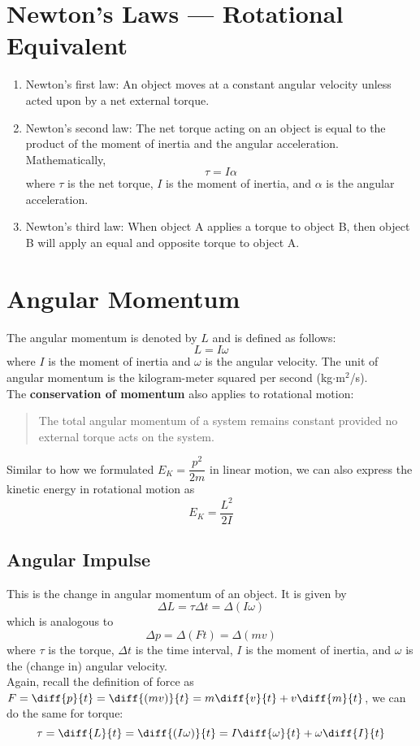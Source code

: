 \documentclass[a4paper,12pt]{article}
\let\oldsection\section
\renewcommand\section{\clearpage\oldsection}
\newcommand{\lb}{\\[8pt]}
\begin{document}
\section{Newton's Laws --- Rotational Equivalent}

\begin{enumerate}
  \item Newton's first law: An object moves at a constant angular velocity unless acted upon by a net external torque.
  \item Newton's second law: The net torque acting on an object is equal to the product of the moment of inertia and the angular acceleration. Mathematically, $$\tau = I\alpha$$where $\tau$ is the net torque, $I$ is the moment of inertia, and $\alpha$ is the angular acceleration.
  \item Newton's third law: When object A applies a torque to object B, then object B will apply an equal and opposite torque to object A.
\end{enumerate}

\section{Angular Momentum}

The angular momentum is denoted by $L$ and is defined as follows:
$$L = I\omega$$where $I$ is the moment of inertia and $\omega$ is the angular velocity. The unit of angular momentum is the kilogram-meter squared per second (kg$\cdot$m$^2$/s).\lb
The \textbf{conservation of momentum} also applies to rotational motion:
\begin{quote}
  The total angular momentum of a system remains constant provided no
  external torque acts on the system.
\end{quote}
Similar to how we formulated $E_K = \dfrac{p^2}{2m}$ in linear motion, we can also express the kinetic energy in rotational motion as  $$E_K = \dfrac{L^2}{2I}$$

\subsection{Angular Impulse}

This is the change in angular momentum of an object. It is given by $$\Delta L = \tau \Delta t = \Delta(I\omega)$$which is analogous to$$\Delta p = \Delta(Ft) = \Delta(mv)$$where $\tau$ is the torque, $\Delta t$ is the time interval, $I$ is the moment of inertia, and $\omega$ is the (change in) angular velocity.\lb
Again, recall the definition of force as $F = \diff{p}{t} = \diff{(mv)}{t} = m\diff{v}{t} + v\diff{m}{t}$, we can do the same for torque: $$\tau = \diff{L}{t} = \diff{(I\omega)}{t} = I\diff{\omega}{t} + \omega\diff{I}{t}$$
\end{document}
